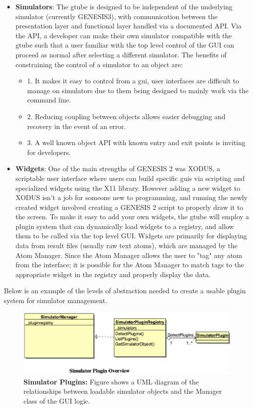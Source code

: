 \documentclass[12pt]{article}
\begin{document}
\begin{itemize}
\item[] {\bf Simulators}: The gtube is designed to be independent of the underlying simulator (currently GENESIS3), with communication between the presentation layer and functional layer handled via a documented API. Via the API, a developer can make their own simulator compatible with the gtube such that a user familiar with the top level control of the GUI can proceed as normal after selecting a different simulator. The benefits of constraining the control of a simulator to an object are: 

	\begin{itemize}
		\item[] 1. It makes it easy to control from a gui, user interfaces are difficult to manage on simulators due to them being designed to mainly work via the command line.
		\item[] 2. Reducing coupling between objects allows easier debugging and recovery in the event of an error.
		\item[] 3. A well known object API with known entry and exit points is inviting for developers.
	\end{itemize}
		
	
\item[] {\bf Widgets}: One of the main strengths of GENESIS 2 was XODUS, a scriptable user interface where users can build specific guis via scripting and specialized widgets using the X11 library. However adding a new widget to XODUS isn't a job for someone new to programming, and running the newly created widget involved creating a GENESIS 2 script to properly draw it to the screen. To make it easy to add your own widgets, the gtube will employ a plugin system that can dynamically load widgets to a registry, and allow them to be called via the top level GUI. 
	Widgets are primarily for displaying data from result files (usually raw text atoms), which are managed by the Atom Manager. Since the Atom Manager allows the user to "tag" any atom from the interface; it is possible for the Atom Manager to match tags to the appropriate widget in the registry and properly display the data. 

\end{itemize}

Below is an example of the levels of abstraction needed to create a usable plugin system for simulator management.

\begin{figure}[ht]
   \centering
   \includegraphics[scale=0.6]{figures/SimulatorPluginOverview.eps}
   \caption{{\bf Simulator Plugins:} Figure shows a UML diagram of the relationships between loadable simulator objects and the Manager class of the GUI logic.}
   \label{fig:Simulator Plugin Overview}
\end{figure}
\end{document}
